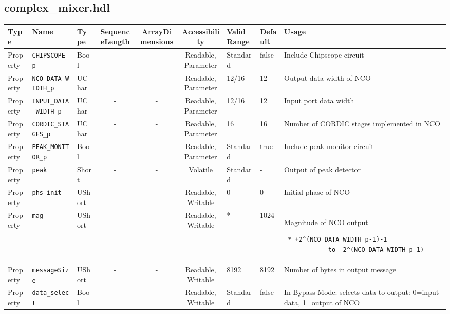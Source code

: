 \documentclass{article}
\def\comp{complex\_mixer}
\begin{document}
\begin{landscape}
	\subsection*{\comp.hdl}
	\begin{scriptsize}
		\begin{tabular}{|p{1.5cm}|p{2.5cm}|p{1cm}|c|c|c|p{2cm}|p{1cm}|p{5cm}|}
			\hline
			\rowcolor{blue}
			Type     & Name                      & Type  & SequenceLength & ArrayDimensions & Accessibility       & Valid Range & Default & Usage                                      \\
			\hline
			Property & \verb+CHIPSCOPE_p+        & Bool  & -              & -               & Readable, Parameter & Standard    & false   & Include Chipscope circuit                  \\
			\hline
			Property & \verb+NCO_DATA_WIDTH_p+   & UChar & -              & -               & Readable, Parameter & 12/16       & 12      & Output data width of NCO                   \\
			\hline
			Property & \verb+INPUT_DATA_WIDTH_p+ & UChar & -              & -               & Readable, Parameter & 12/16       & 12      & Input port data width                      \\
			\hline
			Property & \verb+CORDIC_STAGES_p+    & UChar & -              & -               & Readable, Parameter & 16          & 16      & Number of CORDIC stages implemented in NCO \\
			\hline
			Property & \verb+PEAK_MONITOR_p+     & Bool  & -              & -               & Readable, Parameter & Standard    & true    & Include peak monitor circuit               \\
			\hline
			Property & \verb+peak+               & Short & -              & -               & Volatile            & Standard    & -       & Output of peak detector                    \\
			\hline
			Property & \verb+phs_init+    & UShort & -              & -               & Readable, Writable & 0           & 0       & Initial phase of NCO                                                          \\
			\hline
			Property & \verb+mag+         & UShort & -              & -               & Readable, Writable & *           & 1024    & Magnitude of NCO output \scriptsize\begin{verbatim} * +2^(NCO_DATA_WIDTH_p-1)-1
			to -2^(NCO_DATA_WIDTH_p-1)\end{verbatim}\\
			\hline
			Property & \verb+messageSize+ & UShort & -              & -               & Readable, Writable & 8192        & 8192    & Number of bytes in output message                                             \\
			\hline
			Property & \verb+data_select+     & Bool  & -              & -               & Readable, Writable & Standard    & false    & In Bypass Mode: selects data to output: 0=input data, 1=output of NCO   \\
			\hline
		\end{tabular}
	\end{scriptsize}


\end{landscape}
\end{document}
